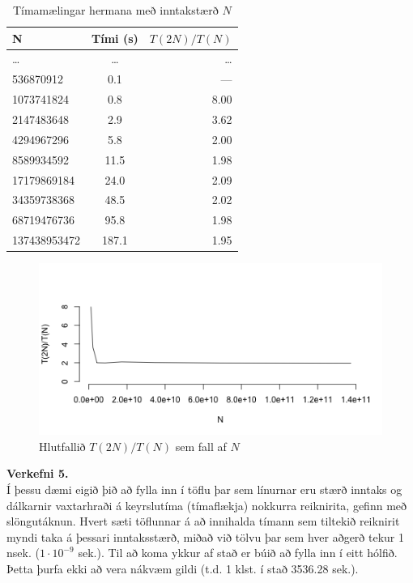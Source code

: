 \documentclass[a4paper, 12pt]{article}
\begin{document}
\begin{table}[ht!]
  \centering
  \caption{Tímamælingar hermana með inntakstærð $N$}
  \begin{tabular}{lcr}
    \toprule
    N              & Tími (s)  & $T(2N)/T(N)$ \\
    \midrule
    \ldots         & \ldots & \ldots \\
    536870912	     & 0.1  & — \\ 
    1073741824	   & 0.8  & 8.00 \\
    2147483648	   & 2.9  & 3.62 \\
    4294967296	   & 5.8  & 2.00 \\
    8589934592	   & 11.5 & 1.98 \\
    17179869184	   & 24.0 & 2.09 \\
    34359738368	   & 48.5 & 2.02 \\
    68719476736	   & 95.8 & 1.98\\
    137438953472	 & 187.1 & 1.95 \\
    \bottomrule
  \end{tabular}
\end{table}

\begin{figure}[ht!]
  \centering
  \includegraphics[width=\textwidth]{rplot.png}
  \caption{Hlutfallið $T(2N)/T(N)$ sem fall af $N$}
\end{figure}

\newpage

\noindent
\textbf{Verkefni 5.} \\
Í þessu dæmi eigið þið að fylla inn í töflu þar sem línurnar eru stærð
inntaks og dálkarnir vaxtarhraði á keyrslutíma (tímaflækja) nokkurra reiknirita, gefinn með slöngutáknun.
Hvert sæti töflunnar á að innihalda tímann sem tiltekið reiknirit myndi taka á þessari inntaksstærð, miðað
við tölvu þar sem hver aðgerð tekur 1 nsek. ($1 \cdot 10^{-9}$ sek.). Til að koma ykkur af stað er búið að
fylla inn í eitt hólfið. Þetta þurfa ekki að vera nákvæm gildi (t.d. 1 klst. í stað 3536.28 sek.).
\end{document}
